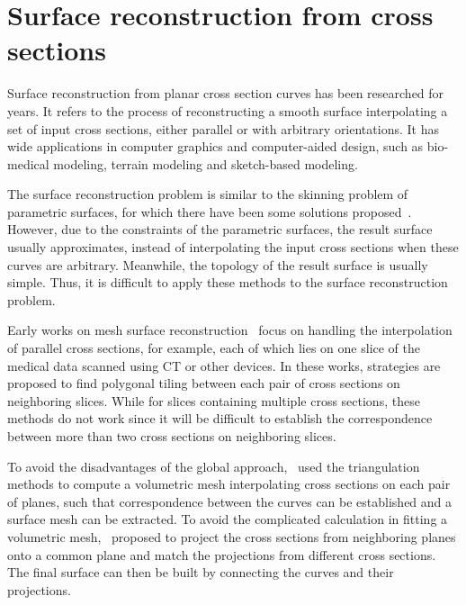 \section{Surface reconstruction from cross sections}\label{ch2:sec:surfreconst}

Surface reconstruction  from planar cross section curves has been
researched for years. It refers to the process of reconstructing a
smooth surface interpolating a set of input cross sections, either
parallel or with arbitrary orientations. It has wide applications in
computer graphics and computer-aided design, such as bio-medical
modeling, terrain modeling and sketch-based modeling.

The surface reconstruction problem is similar to the skinning problem
of parametric surfaces, for which there have been some solutions
proposed~\cite{NAH03,SWZ04,HL07}. However, due to the constraints of the 
parametric surfaces, the result surface usually approximates, instead of 
interpolating the input cross sections when these curves are arbitrary. 
Meanwhile, the topology of the result surface is usually simple. 
Thus, it is difficult to apply these methods to the surface reconstruction problem.

Early  works on mesh surface reconstruction~\cite{KE75, FKU77,
CS78, Kd82, GD82, WA86} focus on handling the interpolation of
parallel cross sections, for example, each of which lies on one
slice of the medical data scanned using CT or other devices. In
these works, strategies are proposed to find polygonal tiling
between each pair of cross sections on neighboring slices. While
for slices containing multiple cross sections, these methods do not
work since it will be difficult to establish the correspondence
between more than two cross sections on neighboring slices.

To avoid the  disadvantages of the global approach,~\cite{BJ88,
MSS92, GB93, FL98, CD99} used the triangulation methods to compute
a volumetric mesh interpolating cross sections on each pair of
planes, such that correspondence between the curves can be
established and a surface mesh can be extracted. To avoid the
complicated calculation in fitting a volumetric
mesh,~\cite{BS96,BCL96,OPC96,KSS00,BGLS04,JWCET05,BV07} proposed to
project the cross sections from neighboring planes onto a common
plane and match the projections from different cross sections. The
final surface can then be built by connecting the curves and their
projections.

